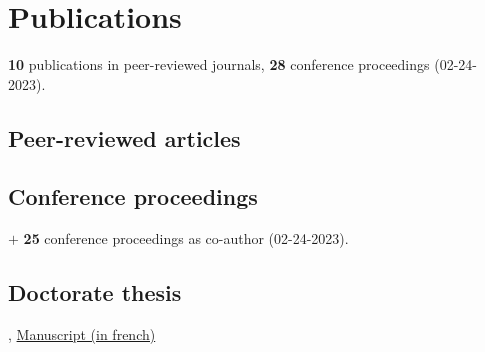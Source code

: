 \section{Publications}
\textbf{10} publications in peer-reviewed journals, \textbf{28} conference proceedings (02-24-2023).

\subsection{Peer-reviewed articles}

\tabitem {}

\tabitem {}

\tabitem {}

\tabitem {}

\tabitem {}

\tabitem {}

\tabitem {}

\tabitem {}

\tabitem {}

\tabitem {}

\subsection{Conference proceedings}
\tabitem {}

\tabitem {}

\tabitem {}

$+$ \textbf{25} conference proceedings as co-author (02-24-2023).

\subsection{Doctorate thesis}
, \href{https://raw.githubusercontent.com/fkeruzore/PhDThesis-public/main/manuscrit.pdf}{Manuscript (in french)}
